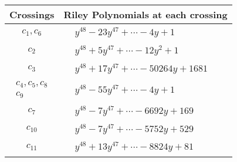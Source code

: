 \documentclass[1p]{elsarticle_modified}
\theoremstyle{definition}
\begin{document}
\begin{tabular}{m{50pt}|m{274pt}}
Crossings & \hspace{64pt}Riley Polynomials at each crossing \\
\hline $$\begin{aligned}c_{1},c_{6}\end{aligned}$$&$\begin{aligned}
&y^{48}-23 y^{47}+\cdots-4 y+1
\end{aligned}$\\
\hline $$\begin{aligned}c_{2}\end{aligned}$$&$\begin{aligned}
&y^{48}+5 y^{47}+\cdots-12 y^2+1
\end{aligned}$\\
\hline $$\begin{aligned}c_{3}\end{aligned}$$&$\begin{aligned}
&y^{48}+17 y^{47}+\cdots-50264 y+1681
\end{aligned}$\\
\hline $$\begin{aligned}c_{4},c_{5},c_{8}\\c_{9}\end{aligned}$$&$\begin{aligned}
&y^{48}-55 y^{47}+\cdots-4 y+1
\end{aligned}$\\
\hline $$\begin{aligned}c_{7}\end{aligned}$$&$\begin{aligned}
&y^{48}-7 y^{47}+\cdots-6692 y+169
\end{aligned}$\\
\hline $$\begin{aligned}c_{10}\end{aligned}$$&$\begin{aligned}
&y^{48}-7 y^{47}+\cdots-5752 y+529
\end{aligned}$\\
\hline $$\begin{aligned}c_{11}\end{aligned}$$&$\begin{aligned}
&y^{48}+13 y^{47}+\cdots-8824 y+81
\end{aligned}$\\
\hline
\end{tabular}
\vskip 2pc
\end{document}
